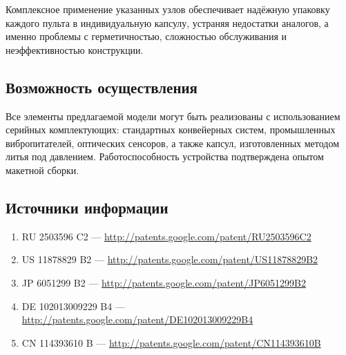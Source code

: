 \documentclass{bsuir}
\begin{document}
Комплексное применение указанных узлов обеспечивает надёжную упаковку каждого пульта в индивидуальную капсулу, устраняя
недостатки аналогов, а именно проблемы с герметичностью, сложностью обслуживания и неэффективностью конструкции.

\subsection*{Возможность осуществления}

Все элементы предлагаемой модели могут быть реализованы с использованием серийных комплектующих: стандартных конвейерных
систем, промышленных вибропитателей, оптических сенсоров, а также капсул, изготовленных методом литья под давлением.
Работоспособность устройства подтверждена опытом макетной сборки.

\subsection*{Источники информации}

\begin{enumerate}
    \item RU 2503596 C2 --- \url{http://patents.google.com/patent/RU2503596C2}
    \item US 11878829 B2 --- \url{http://patents.google.com/patent/US11878829B2}
    \item JP 6051299 B2 --- \url{http://patents.google.com/patent/JP6051299B2}
    \item DE 102013009229 B4 --- \url{http://patents.google.com/patent/DE102013009229B4}
    \item CN 114393610 B --- \url{http://patents.google.com/patent/CN114393610B}
\end{enumerate}
\end{document}
